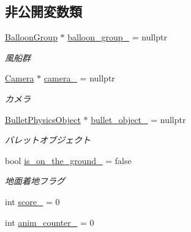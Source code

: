 \subsection*{非公開変数類}
\begin{DoxyCompactItemize}
\item 
\mbox{\hyperlink{class_balloon_group}{Balloon\+Group}} $\ast$ \mbox{\hyperlink{class_player_ac0e8f407322bde4ee86300624b26eb56}{balloon\+\_\+group\+\_\+}} = nullptr
\begin{DoxyCompactList}\small\item\em 風船群 \end{DoxyCompactList}\item 
\mbox{\hyperlink{class_camera}{Camera}} $\ast$ \mbox{\hyperlink{class_player_aab89171e78f99d2604210055d2f10734}{camera\+\_\+}} = nullptr
\begin{DoxyCompactList}\small\item\em カメラ \end{DoxyCompactList}\item 
\mbox{\hyperlink{class_bullet_physics_object}{Bullet\+Physics\+Object}} $\ast$ \mbox{\hyperlink{class_player_ad2aef02a40527af4f79dc99d652f5e7c}{bullet\+\_\+object\+\_\+}} = nullptr
\begin{DoxyCompactList}\small\item\em バレットオブジェクト \end{DoxyCompactList}\item 
bool \mbox{\hyperlink{class_player_a4d724c47f9c39bbd760bbc86dc895bd0}{is\+\_\+on\+\_\+the\+\_\+ground\+\_\+}} = false
\begin{DoxyCompactList}\small\item\em 地面着地フラグ \end{DoxyCompactList}\item 
int \mbox{\hyperlink{class_player_a423e2096b25d4965a84e4a8bf38c7683}{score\+\_\+}} = 0
\item 
int \mbox{\hyperlink{class_player_afe5d702e0d5f909d5c562df8a0e6cd9f}{anim\+\_\+counter\+\_\+}} = 0
\end{DoxyCompactItemize}
